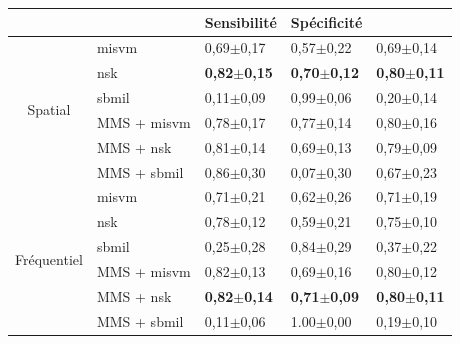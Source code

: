 \begin{table}[H]
    \centering
    \begin{tabular}{cllll}
        \toprule
        \multicolumn{1}{l}{}         &                          & Sensibilité               & Spécificité               & \Fscore{}                 \\ \midrule
        \multirow{6}{*}{Spatial}     & \gls{misvm}              & 0,69$\pm$0,17             & 0,57$\pm$0,22             & 0,69$\pm$0,14             \\
                                     & \gls{nsk}                & \textbf{0,82$\pm$0,15}    & \textbf{0,70$\pm$0,12}    & \textbf{0,80$\pm$0,11}    \\
                                     & \gls{sbmil}              & 0,11$\pm$0,09             & 0,99$\pm$0,06             & 0,20$\pm$0,14             \\
                                     & MMS + \gls{misvm}        & 0,78$\pm$0,17             & 0,77$\pm$0,14             & 0,80$\pm$0,16             \\
                                     & MMS + \gls{nsk}          & 0,81$\pm$0,14             & 0,69$\pm$0,13             & 0,79$\pm$0,09             \\
                                     & MMS + \gls{sbmil}        & 0,86$\pm$0,30             & 0,07$\pm$0,30             & 0,67$\pm$0,23             \\ \midrule
        \multirow{6}{*}{Fréquentiel} & \gls{misvm}              & 0,71$\pm$0,21             & 0,62$\pm$0,26             & 0,71$\pm$0,19             \\
                                     & \gls{nsk}                & 0,78$\pm$0,12             & 0,59$\pm$0,21             & 0,75$\pm$0,10             \\
                                     & \gls{sbmil}              & 0,25$\pm$0,28             & 0,84$\pm$0,29             & 0,37$\pm$0,22             \\
                                     & MMS + \gls{misvm}        & 0,82$\pm$0,13             & 0,69$\pm$0,16             & 0,80$\pm$0,12             \\
                                     & MMS + \gls{nsk}          & \textbf{0,82$\pm$0,14}    & \textbf{0,71$\pm$0,09}    & \textbf{0,80$\pm$0,11}    \\
                                     & MMS + \gls{sbmil}        & 0,11$\pm$0,06             & 1.00$\pm$0,00             & 0,19$\pm$0,10             \\ \midrule

\end{tabular}
\end{table}
